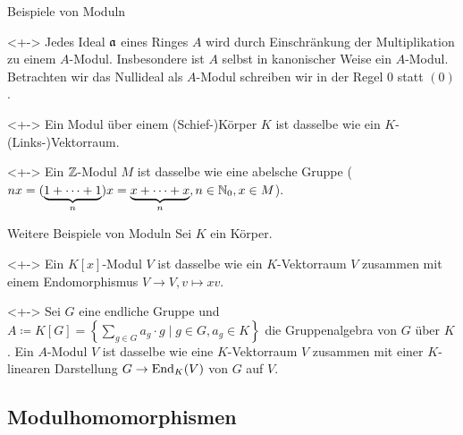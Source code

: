 \begin{frame}{Beispiele von Moduln}
	\begin{example}<+->
		Jedes Ideal \(\mathfrak{a}\) eines Ringes \(A\) wird durch Einschränkung der
		Multiplikation zu einem \(A\)-Modul. Insbesondere ist \(A\) selbst in
		kanonischer Weise ein \(A\)-Modul.
		\\
		Betrachten wir das Nullideal als \(A\)-Modul schreiben wir in der Regel \(0\) statt \((0)\).		
	\end{example}
	\begin{example}<+->
		Ein Modul über einem (Schief-)Körper \(K\) ist dasselbe wie ein
		\(K\)-(Links-)Vektorraum.
	\end{example}
	\begin{example}<+->
		Ein \(\mathbb Z\)-Modul \(M\) ist dasselbe wie eine abelsche Gruppe
		(\(n x = (\underbrace{1 + \dotsb + 1}_n) x = \underbrace{x + \dotsb + x}_n,
		n \in \mathbb N_0, x \in M\)).
	\end{example}
\end{frame}

\begin{frame}{Weitere Beispiele von Moduln}
	Sei \(K\) ein Körper.
	\begin{example}<+->
		Ein \(K[x]\)-Modul \(V\) ist dasselbe wie ein
		\(K\)-Vektorraum \(V\) zusammen mit einem Endomorphismus \(V \to V,
		v \mapsto x v\).
	\end{example}
	\begin{example}<+->
		Sei \(G\) eine endliche Gruppe und \(A \coloneqq K[G] =
		\left\{\sum\limits_{g \in G} a_g \cdot g \mid g \in G, a_g \in K\right\}\) die Gruppenalgebra von
		\(G\) über \(K\). Ein \(A\)-Modul \(V\) ist dasselbe wie eine \(K\)-Vektorraum \(V\)
		zusammen mit einer \(K\)-linearen Darstellung \(G \to \operatorname{End}_K(V)\) von \(G\)
		auf \(V\).
	\end{example}
\end{frame}

\subsection{Modulhomomorphismen}

